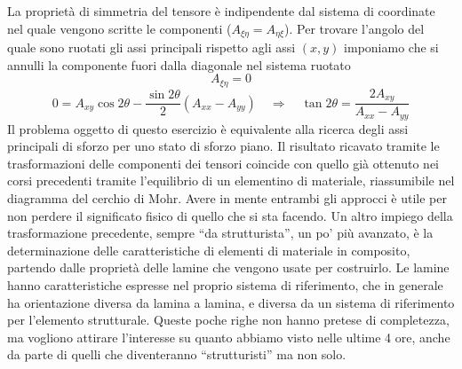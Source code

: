  La proprietà di simmetria del tensore è indipendente dal sistema di coordinate nel quale vengono scritte le componenti
  ($A_{\xi \eta} = A_{\eta \xi}$).
  Per trovare l'angolo del quale sono ruotati gli assi principali rispetto agli assi $(x,y)$ imponiamo che si annulli la
  componente fuori dalla diagonale nel sistema ruotato
  \begin{equation}
   A_{\xi \eta} = 0
  \end{equation}
  \begin{equation}
   0 = A_{xy} \cos {2\theta} - \dfrac{\sin{2\theta}}{2} (A_{xx}-A_{yy}) \quad \Rightarrow \quad
   \tan {2 \theta} = \dfrac{2 A_{xy}}{A_{xx}-A_{yy}}
  \end{equation}
 Il problema oggetto di questo esercizio è equivalente alla ricerca degli assi principali di sforzo per uno stato di sforzo piano.
  Il risultato ricavato tramite le trasformazioni delle componenti dei tensori coincide con quello  già ottenuto nei corsi precedenti tramite l'equilibrio di un elementino di materiale, riassumibile nel diagramma del cerchio di Mohr. Avere in mente entrambi gli approcci è utile per non perdere il significato fisico di quello che si sta facendo.
 \newline \noindent 
  Un altro impiego della trasformazione precedente, sempre ``da strutturista'', un po' più avanzato, è la determinazione 
  delle caratteristiche di elementi di materiale in composito, partendo dalle proprietà delle lamine che vengono 
  usate per costruirlo.
  Le lamine hanno caratteristiche espresse nel proprio sistema di riferimento, che in generale ha orientazione diversa
  da lamina a lamina, e diversa da un sistema di riferimento per l'elemento strutturale.
 \newline \noindent 
 Queste poche righe non hanno pretese di completezza, ma vogliono attirare l'interesse su quanto abbiamo visto nelle ultime 4 ore,
  anche da parte di quelli che diventeranno ``strutturisti'' ma non solo.
  
